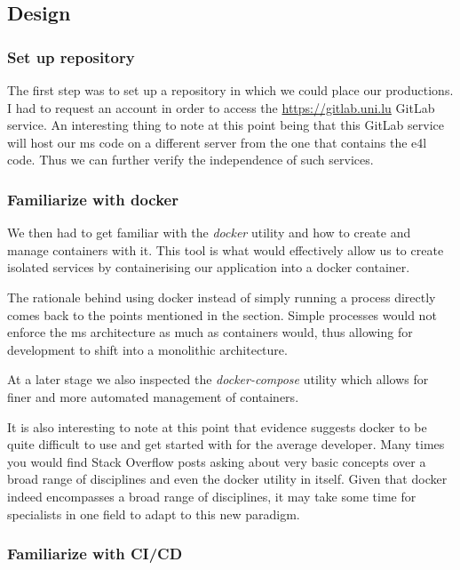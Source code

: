 \subsection{Design}

\subsubsection{Set up repository}

The first step was to set up a repository in which we could place our
productions. I had to request an account in order to access the
\url{https://gitlab.uni.lu} GitLab service. An interesting thing to
note at this point being that this GitLab service will host our
\gls{ms} code on a different server from the one that contains the
\gls{e4l} code. Thus we can further verify the independence of such
services.

\subsubsection{Familiarize with docker}

We then had to get familiar with the \textit{docker} utility and how
to create and manage containers with it. This tool is what would
effectively allow us to create isolated services by containerising our
application into a docker container.

The rationale behind using docker instead of simply running a process
directly comes back to the points mentioned in the
 section. Simple processes would not
enforce the \gls{ms} architecture as much as containers would, thus
allowing for development to shift into a monolithic architecture.

At a later stage we also inspected the \textit{docker-compose}
utility which allows for finer and more automated management of
containers.

It is also interesting to note at this point that evidence suggests
docker to be quite difficult to use and get started with for the
average developer. Many times you would find Stack Overflow posts
asking about very basic concepts over a broad range of disciplines and
even the docker utility in itself. \cite{docker-so} Given that docker
indeed encompasses a broad range of disciplines, it may take some time
for specialists in one field to adapt to this new paradigm.

\subsubsection{Familiarize with CI/CD}

